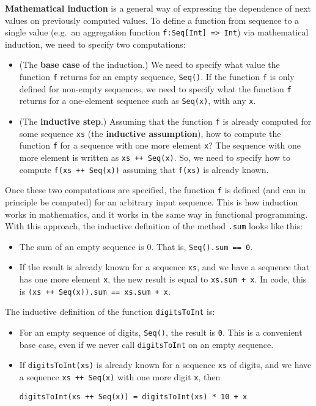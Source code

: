 \textbf{Mathematical induction} is
a general way of expressing the dependence of next values on previously
computed values. To define a function from sequence to a single value
(e.g.~an aggregation function \lstinline!f:Seq[Int] => Int!) via
mathematical induction, we need to specify two computations:
\begin{itemize}
\item (\textbf{}The \textbf{base
case} of the induction.) We need to specify what value the function
\lstinline!f! returns for an empty sequence, \lstinline!Seq()!.
If the function \lstinline!f! is only defined for non-empty sequences,
we need to specify what the function \lstinline!f! returns for a
one-element sequence such as \lstinline!Seq(x)!, with any \lstinline!x!.
\item (\textbf{}The \textbf{inductive
step}.) Assuming that the function \lstinline!f! is already computed
for some sequence \lstinline!xs! (the \textbf{inductive
assumption}), how to compute the function \lstinline!f! for a sequence
with one more element \lstinline!x!? The sequence with one more element
is written as \lstinline!xs ++ Seq(x)!. So, we need to specify how
to compute \lstinline!f(xs ++ Seq(x))! assuming that \lstinline!f(xs)!
is already known.
\end{itemize}
Once these two computations are specified, the function \lstinline!f!
is defined (and can in principle be computed) for an arbitrary input
sequence. This is how induction works in mathematics, and it works
in the same way in functional programming. With this approach, the
inductive definition of the method \lstinline!.sum! looks like this:
\begin{itemize}
\item The sum of an empty sequence is $0$. That is, \lstinline!Seq().sum == 0!.
\item If the result is already known for a sequence \lstinline!xs!, and
we have a sequence that has one more element \lstinline!x!, the new
result is equal to \lstinline!xs.sum + x!. In code, this is \lstinline!(xs ++ Seq(x)).sum == xs.sum + x!.
\end{itemize}
The inductive definition of the function \lstinline!digitsToInt!
is:
\begin{itemize}
\item For an empty sequence of digits, \lstinline!Seq()!, the result is
\lstinline!0!. This is a convenient base case, even if we never call
\lstinline!digitsToInt! on an empty sequence.
\item If \lstinline!digitsToInt(xs)! is already known for a sequence \lstinline!xs!
of digits, and we have a sequence \lstinline!xs ++ Seq(x)! with one
more digit \lstinline!x!, then
\begin{lstlisting}
digitsToInt(xs ++ Seq(x)) = digitsToInt(xs) * 10 + x
\end{lstlisting}
\end{itemize}
